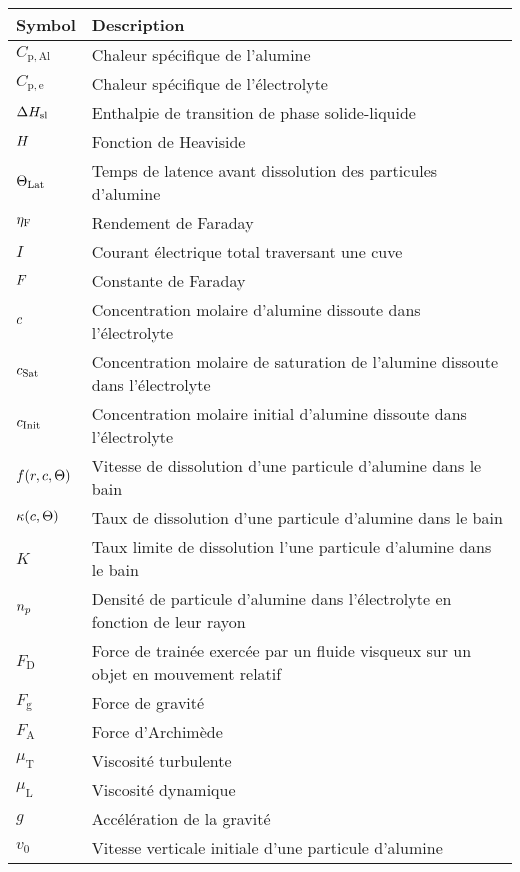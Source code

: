 \begin{tabularx}{\textwidth}{@{}ll@{}}
  \toprule
  Symbol & Description \\
  \midrule
  $C_\mathrm{p,Al}$ & Chaleur spécifique de l'alumine\\
  $C_\mathrm{p,e}$ & Chaleur spécifique de l'électrolyte\\
  $\Delta H_\mathrm{sl}$ & Enthalpie de transition de phase solide-liquide\\
  $H$ & Fonction de Heaviside\\
  $\Theta_\text{Lat}$ & Temps de latence avant dissolution des particules d'alumine\\
  $\eta_\mathrm{F}$ & Rendement de Faraday\\
  $I$ & Courant électrique total traversant une cuve\\
  $F$ & Constante de Faraday\\
  $c$ & Concentration molaire d'alumine dissoute dans l'électrolyte\\
  $c_\text{Sat}$ & Concentration molaire de saturation de l'alumine dissoute dans l'électrolyte\\
  $c_\text{Init}$ & Concentration molaire initial d'alumine dissoute dans l'électrolyte\\
  $f(r, c,\Theta)$ & Vitesse de dissolution d'une particule d'alumine dans le bain\\
  $\kappa(c, \Theta)$ & Taux de dissolution d'une particule d'alumine dans le bain\\
  $K$ & Taux limite de dissolution l'une particule d'alumine dans le bain \\
  $n_p$ & Densité de particule d'alumine dans l'électrolyte en fonction de leur rayon\\
  $F_\mathrm{D}$ & Force de trainée exercée par un fluide visqueux sur un objet en mouvement relatif\\
  $F_\mathrm{g}$ & Force de gravité\\
  $F_\mathrm{A}$ & Force d'Archimède\\
  $\mu_\mathrm{T}$ & Viscosité turbulente\\
  $\mu_\mathrm{L}$ & Viscosité dynamique\\
  $g$ & Accélération de la gravité \\
  $v_0$ & Vitesse verticale initiale d'une particule d'alumine \\

\end{tabularx}
